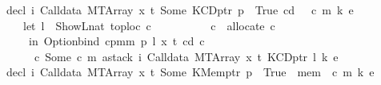 \begin{isabellebody}
\isanewline
\isanewline
{\isacharbar}{\kern0pt}\ {\isachardoublequoteopen}decl\ i\ {\isacharparenleft}{\kern0pt}Calldata\ {\isacharparenleft}{\kern0pt}MTArray\ x\ t{\isacharparenright}{\kern0pt}{\isacharparenright}{\kern0pt}\ {\isacharparenleft}{\kern0pt}Some\ {\isacharparenleft}{\kern0pt}KCDptr\ p{\isacharcomma}{\kern0pt}\ {\isacharunderscore}{\kern0pt}{\isacharparenright}{\kern0pt}{\isacharparenright}{\kern0pt}\ True\ cd\ {\isacharunderscore}{\kern0pt}\ {\isacharunderscore}{\kern0pt}\ {\isacharparenleft}{\kern0pt}c{\isacharcomma}{\kern0pt}\ m{\isacharcomma}{\kern0pt}\ k{\isacharcomma}{\kern0pt}\ e{\isacharparenright}{\kern0pt}\ {\isacharequal}{\kern0pt}\isanewline
\ \ \ \ {\isacharparenleft}{\kern0pt}let\ l\ {\isacharequal}{\kern0pt}\ ShowL\isactrlsub n\isactrlsub a\isactrlsub t\ {\isacharparenleft}{\kern0pt}toploc\ c{\isacharparenright}{\kern0pt}{\isacharsemicolon}{\kern0pt}\isanewline
\ \ \ \ \ \ \ \ \ {\isacharparenleft}{\kern0pt}{\isacharunderscore}{\kern0pt}{\isacharcomma}{\kern0pt}\ c{\isacharprime}{\kern0pt}{\isacharparenright}{\kern0pt}\ {\isacharequal}{\kern0pt}\ allocate\ c\isanewline
\ \ \ \ \ in\ Option{\isachardot}{\kern0pt}bind\ {\isacharparenleft}{\kern0pt}cpm{}m\ p\ l\ x\ t\ cd\ c{\isacharprime}{\kern0pt}{\isacharparenright}{\kern0pt}\isanewline
\ \ \ \ \ \ {\isacharparenleft}{\kern0pt}{\isasymlambda}c{\isacharprime}{\kern0pt}{\isacharprime}{\kern0pt}{\isachardot}{\kern0pt}\ Some\ {\isacharparenleft}{\kern0pt}c{\isacharprime}{\kern0pt}{\isacharprime}{\kern0pt}{\isacharcomma}{\kern0pt}\ m{\isacharcomma}{\kern0pt}\ astack\ i\ {\isacharparenleft}{\kern0pt}Calldata\ {\isacharparenleft}{\kern0pt}MTArray\ x\ t{\isacharparenright}{\kern0pt}{\isacharparenright}{\kern0pt}\ {\isacharparenleft}{\kern0pt}KCDptr\ l{\isacharparenright}{\kern0pt}\ {\isacharparenleft}{\kern0pt}k{\isacharcomma}{\kern0pt}\ e{\isacharparenright}{\kern0pt}{\isacharparenright}{\kern0pt}{\isacharparenright}{\kern0pt}{\isacharparenright}{\kern0pt}{\isachardoublequoteclose}\isanewline
{\isacharbar}{\kern0pt}\ {\isachardoublequoteopen}decl\ i\ {\isacharparenleft}{\kern0pt}Calldata\ {\isacharparenleft}{\kern0pt}MTArray\ x\ t{\isacharparenright}{\kern0pt}{\isacharparenright}{\kern0pt}\ {\isacharparenleft}{\kern0pt}Some\ {\isacharparenleft}{\kern0pt}KMemptr\ p{\isacharcomma}{\kern0pt}\ {\isacharunderscore}{\kern0pt}{\isacharparenright}{\kern0pt}{\isacharparenright}{\kern0pt}\ True\ {\isacharunderscore}{\kern0pt}\ mem\ {\isacharunderscore}{\kern0pt}\ {\isacharparenleft}{\kern0pt}c{\isacharcomma}{\kern0pt}\ m{\isacharcomma}{\kern0pt}\ k{\isacharcomma}{\kern0pt}\ e{\isacharparenright}{\kern0pt}\ {\isacharequal}{\kern0pt}\isanewline

\end{isabellebody}
